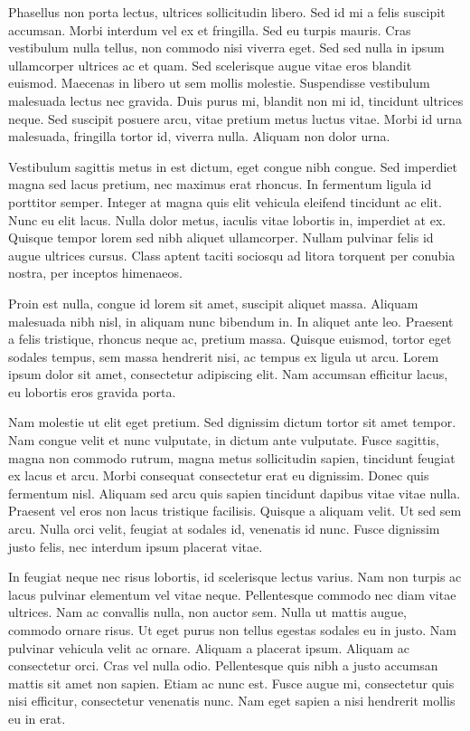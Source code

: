 Phasellus non porta lectus, ultrices sollicitudin libero. Sed id mi a felis suscipit accumsan. Morbi interdum vel ex et fringilla. Sed eu turpis mauris. Cras vestibulum nulla tellus, non commodo nisi viverra eget. Sed sed nulla in ipsum ullamcorper ultrices ac et quam. Sed scelerisque augue vitae eros blandit euismod. Maecenas in libero ut sem mollis molestie. Suspendisse vestibulum malesuada lectus nec gravida. Duis purus mi, blandit non mi id, tincidunt ultrices neque. Sed suscipit posuere arcu, vitae pretium metus luctus vitae. Morbi id urna malesuada, fringilla tortor id, viverra nulla. Aliquam non dolor urna.

Vestibulum sagittis metus in est dictum, eget congue nibh congue. Sed imperdiet magna sed lacus pretium, nec maximus erat rhoncus. In fermentum ligula id porttitor semper. Integer at magna quis elit vehicula eleifend tincidunt ac elit. Nunc eu elit lacus. Nulla dolor metus, iaculis vitae lobortis in, imperdiet at ex. Quisque tempor lorem sed nibh aliquet ullamcorper. Nullam pulvinar felis id augue ultrices cursus. Class aptent taciti sociosqu ad litora torquent per conubia nostra, per inceptos himenaeos.

Proin est nulla, congue id lorem sit amet, suscipit aliquet massa. Aliquam malesuada nibh nisl, in aliquam nunc bibendum in. In aliquet ante leo. Praesent a felis tristique, rhoncus neque ac, pretium massa. Quisque euismod, tortor eget sodales tempus, sem massa hendrerit nisi, ac tempus ex ligula ut arcu. Lorem ipsum dolor sit amet, consectetur adipiscing elit. Nam accumsan efficitur lacus, eu lobortis eros gravida porta.

Nam molestie ut elit eget pretium. Sed dignissim dictum tortor sit amet tempor. Nam congue velit et nunc vulputate, in dictum ante vulputate. Fusce sagittis, magna non commodo rutrum, magna metus sollicitudin sapien, tincidunt feugiat ex lacus et arcu. Morbi consequat consectetur erat eu dignissim. Donec quis fermentum nisl. Aliquam sed arcu quis sapien tincidunt dapibus vitae vitae nulla. Praesent vel eros non lacus tristique facilisis. Quisque a aliquam velit. Ut sed sem arcu. Nulla orci velit, feugiat at sodales id, venenatis id nunc. Fusce dignissim justo felis, nec interdum ipsum placerat vitae.

In feugiat neque nec risus lobortis, id scelerisque lectus varius. Nam non turpis ac lacus pulvinar elementum vel vitae neque. Pellentesque commodo nec diam vitae ultrices. Nam ac convallis nulla, non auctor sem. Nulla ut mattis augue, commodo ornare risus. Ut eget purus non tellus egestas sodales eu in justo. Nam pulvinar vehicula velit ac ornare. Aliquam a placerat ipsum. Aliquam ac consectetur orci. Cras vel nulla odio. Pellentesque quis nibh a justo accumsan mattis sit amet non sapien. Etiam ac nunc est. Fusce augue mi, consectetur quis nisi efficitur, consectetur venenatis nunc. Nam eget sapien a nisi hendrerit mollis eu in erat.


